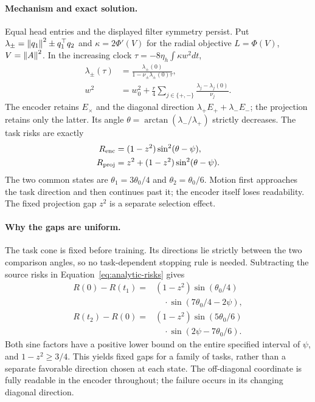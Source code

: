 \paragraph{Mechanism and exact solution.}
Equal head entries and the displayed filter symmetry persist. Put $\lambda_\pm=\left\lVert q_1\right\rVert^2\pm q_1^\top q_2$ and $\kappa=2\Phi'(V)$ for the radial objective $L=\Phi(V)$, $V=\left\lVert A\right\rVert^2$. In the increasing clock $\tau=-8\eta_h\int\kappa w^2dt$,
\begin{align}
 \lambda_\pm(\tau)&=\frac{\lambda_\pm(0)}{1-\nu_\pm\lambda_\pm(0)\tau},\\
 w^2&=w_0^2+\frac r4\sum_{j\in\{+,-\}}
             \frac{\lambda_j-\lambda_j(0)}{\nu_j}.
 \label{eq:analytic-family}
\end{align}
The encoder retains $E_\times$ and the diagonal direction $\lambda_+E_++\lambda_-E_-$; the projection retains only the latter. Its angle $\theta=\arctan(\lambda_-/\lambda_+)$ strictly decreases. The task risks are exactly
\begin{align}
 R_{\rm enc}&=(1-z^2)\sin^2(\theta-\psi),\\
 R_{\rm proj}&=z^2+(1-z^2)\sin^2(\theta-\psi).
 \label{eq:analytic-risks}
\end{align}
The two common states are $\theta_1=3\theta_0/4$ and $\theta_2=\theta_0/6$. Motion first approaches the task direction and then continues past it; the encoder itself loses readability. The fixed projection gap $z^2$ is a separate selection effect.

\paragraph{Why the gaps are uniform.}
The task cone is fixed before training. Its directions lie strictly between the two comparison angles, so no task-dependent stopping rule is needed. Subtracting the source risks in Equation~\eqref{eq:analytic-risks} gives
\begin{align}
 R(0)-R(t_1)={}&(1-z^2)\sin(\theta_0/4)\nonumber\\
 &\quad\cdot\sin(7\theta_0/4-2\psi),\\
 R(t_2)-R(0)={}&(1-z^2)\sin(5\theta_0/6)\nonumber\\
 &\quad\cdot\sin(2\psi-7\theta_0/6).
\end{align}
Both sine factors have a positive lower bound on the entire specified interval of $\psi$, and $1-z^2\ge3/4$. This yields fixed gaps for a family of tasks, rather than a separate favorable direction chosen at each state. The off-diagonal coordinate is fully readable in the encoder throughout; the failure occurs in its changing diagonal direction.

